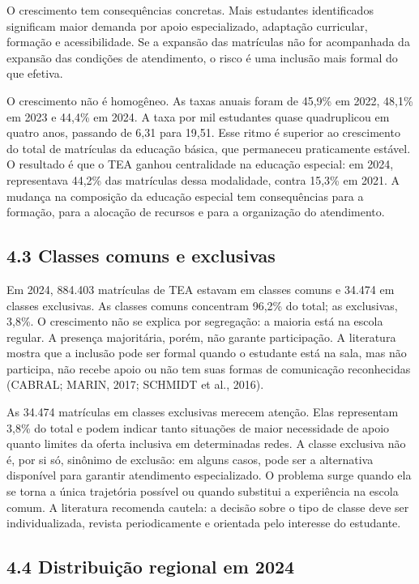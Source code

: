 O crescimento tem consequências concretas. Mais estudantes identificados
significam maior demanda por apoio especializado, adaptação curricular,
formação e acessibilidade. Se a expansão das matrículas não for
acompanhada da expansão das condições de atendimento, o risco é uma
inclusão mais formal do que efetiva.

O crescimento não é homogêneo. As taxas anuais foram de 45,9\% em 2022,
48,1\% em 2023 e 44,4\% em 2024. A taxa por mil estudantes quase
quadruplicou em quatro anos, passando de 6,31 para 19,51. Esse ritmo é
superior ao crescimento do total de matrículas da educação básica, que
permaneceu praticamente estável. O resultado é que o TEA ganhou
centralidade na educação especial: em 2024, representava 44,2\% das
matrículas dessa modalidade, contra 15,3\% em 2021. A mudança na
composição da educação especial tem consequências para a formação, para
a alocação de recursos e para a organização do atendimento.

\subsection{4.3 Classes comuns e
exclusivas}\label{classes-comuns-e-exclusivas}

Em 2024, 884.403 matrículas de TEA estavam em classes comuns e 34.474 em
classes exclusivas. As classes comuns concentram 96,2\% do total; as
exclusivas, 3,8\%. O crescimento não se explica por segregação: a
maioria está na escola regular. A presença majoritária, porém, não
garante participação. A literatura mostra que a inclusão pode ser formal
quando o estudante está na sala, mas não participa, não recebe apoio ou
não tem suas formas de comunicação reconhecidas (CABRAL; MARIN, 2017;
SCHMIDT et al., 2016).

As 34.474 matrículas em classes exclusivas merecem atenção. Elas
representam 3,8\% do total e podem indicar tanto situações de maior
necessidade de apoio quanto limites da oferta inclusiva em determinadas
redes. A classe exclusiva não é, por si só, sinônimo de exclusão: em
alguns casos, pode ser a alternativa disponível para garantir
atendimento especializado. O problema surge quando ela se torna a única
trajetória possível ou quando substitui a experiência na escola comum. A
literatura recomenda cautela: a decisão sobre o tipo de classe deve ser
individualizada, revista periodicamente e orientada pelo interesse do
estudante.

\subsection{4.4 Distribuição regional em
2024}\label{distribuiuxe7uxe3o-regional-em-2024}

